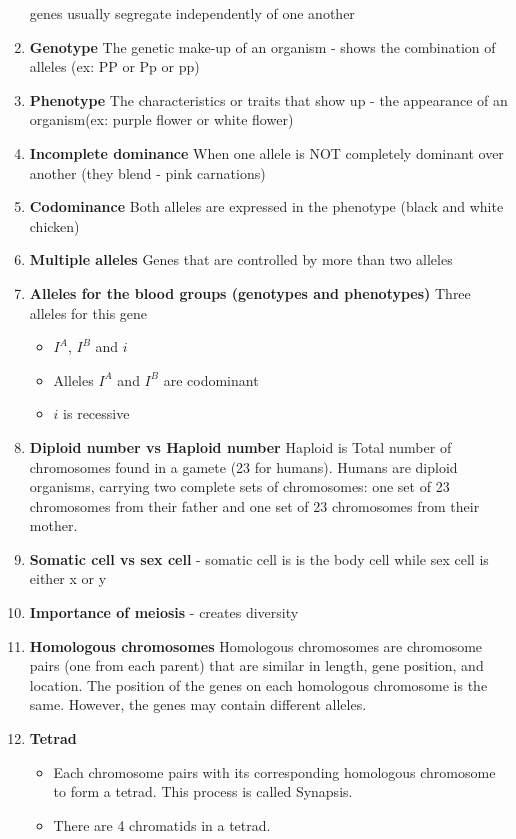 \documentclass[9pt]{article}
\begin{document}
\begin{enumerate}
  genes usually segregate independently of one another
\item {\bf Genotype} The genetic make-up of an organism  -  shows the
  combination of alleles (ex: PP or Pp or pp)
\item {\bf Phenotype} The characteristics or traits that show up - the
  appearance of an organism(ex: purple flower or white flower)
\item {\bf Incomplete dominance} When one allele is NOT completely
  dominant over another (they blend - pink carnations)
\item {\bf Codominance} Both alleles are expressed in the phenotype
  (black and white chicken)
\item {\bf Multiple alleles} Genes that are controlled by more than
  two alleles
\item {\bf Alleles for the blood groups (genotypes and phenotypes)}
  Three alleles for this gene
  \begin{itemize}
    \item $I^A$, $I^B$ and $i$
    \item Alleles $I^A$ and $I^B$ are codominant
    \item $i$ is recessive
  \end{itemize}
\item {\bf Diploid number vs Haploid number} Haploid is Total number
  of chromosomes found in a gamete (23 for humans). Humans are diploid
  organisms, carrying two complete sets of chromosomes: one set of 23
  chromosomes from their father and one set of 23 chromosomes from
  their mother.
\item {\bf Somatic cell vs sex cell} - somatic cell is is the body cell while sex cell is either x or y
\item {\bf Importance of meiosis} - creates diversity
\item {\bf Homologous chromosomes} Homologous chromosomes are
  chromosome pairs (one from each parent) that are similar in length,
  gene position, and location. The position of the genes on each
  homologous chromosome is the same. However, the genes may contain
  different alleles.
\item {\bf Tetrad}
  \begin{itemize}
    \item Each chromosome pairs with its corresponding homologous
      chromosome to form a tetrad. This process is called Synapsis.
    \item There are 4 chromatids in a tetrad.
  \end{itemize}

\end{enumerate}
\end{document}
